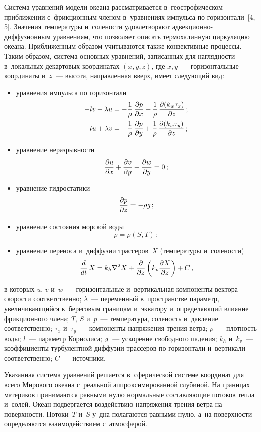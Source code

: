 \begin{multicols}{2}
  Система уравнений модели океана рассматривается в~геострофическом 
приближении с~фрикционным членом в~уравнениях импульса по 
горизон\-тали~[4, 5]. Значения температуры и~солености удовле\-творяют  
ад\-век\-ци\-он\-но-диф\-фу\-зи\-он\-ным уравнениям, что позволяет описать 
термохалинную циркуляцию океана. Приближенным образом учитываются 
также конвективные процессы. Таким образом, система основных уравнений, 
записанных для наглядности в~локальных декартовых координатах $(x, y, z)$, 
где $x, y$~--- горизонтальные координаты и~$z$~--- высота, направленная 
вверх, имеет следующий вид:
  \begin{itemize}
  \item уравнения импульса по горизонтали
  \begin{align*}
  -lv +\lambda u &=-\displaystyle\frac{\displaystyle 1\mathstrut}{\displaystyle \rho\mathstrut}\,\displaystyle\frac{\displaystyle \partial p\mathstrut}{\displaystyle \partial x\mathstrut} 
+\displaystyle\frac{\displaystyle 1\mathstrut}{\displaystyle \rho\mathstrut}\,\displaystyle\frac{\displaystyle \partial(k_w\tau_x)\mathstrut}{\displaystyle \partial z\mathstrut}\,;\\
  lu+\lambda v &= -\displaystyle\frac{\displaystyle 1\mathstrut}{\displaystyle \rho\mathstrut}\,\displaystyle\frac{\displaystyle \partial p\mathstrut}{\displaystyle \partial y\mathstrut} +\displaystyle\frac{\displaystyle 1\mathstrut}{\displaystyle \rho\mathstrut}\, 
\displaystyle\frac{\displaystyle \partial (k_w\tau_y)\mathstrut}{\displaystyle \partial z\mathstrut}\,;
  \end{align*}
  \item уравнение неразрывности
  $$
  \displaystyle\frac{\displaystyle \partial u\mathstrut}{\displaystyle \partial x\mathstrut} +\displaystyle\frac{\displaystyle \partial v\mathstrut}{\displaystyle \partial y\mathstrut} +\displaystyle\frac{\displaystyle \partial w\mathstrut}{\displaystyle \partial y\mathstrut} 
=0\,;
  $$
  \item уравнение гидростатики
  $$
  \displaystyle\frac{\displaystyle \partial p\mathstrut}{\displaystyle \partial z\mathstrut} =-\rho \mbox{\textit{g}}\,;
  $$
  \item уравнение состояния морской воды
  $$
  \rho= \rho(S,T)\,;
  $$
  \item уравнение переноса и~диффузии трассеров~$X$ (температуры 
и~солености)
  $$
  \displaystyle\frac{\displaystyle d\mathstrut}{\displaystyle dt\mathstrut}\,X= k_h\nabla^2 X+\displaystyle\frac{\displaystyle \partial\mathstrut}{\displaystyle \partial z\mathstrut}\left( k_v\displaystyle\frac{\displaystyle \partial 
X\mathstrut}{\displaystyle \partial z\mathstrut} \right) +C\,,
  $$
  \end{itemize}
в которых $u$, $v$ и~$w$~--- горизонтальные и~вертикальная компоненты вектора 
скорости соответственно; $\lambda$~--- переменный в~пространстве параметр, 
увеличивающийся к~береговым границам и~экватору и~определяющий влияние 
фрикционного члена; $T$, $S$ и~$p$~--- температура, соленость и~дав\-ле\-ние 
соответственно; $\tau_x$ и~$\tau_y$~--- компоненты напряжения трения ветра; 
$\rho$~--- плотность воды; $l$~--- параметр Кориолиса; $\mbox{\textit{g}}$~--- ускорение 
свободного падения; $k_h$ и~$k_v$~--- коэффициенты турбулентной диффузии 
трассеров по горизонтали и~вертикали соответственно; $C$~--- источники.

  Указанная система уравнений решается в~сферической системе координат 
для всего Мирового океана с~реальной аппроксимированной глубиной. На 
границах материков принимаются равными нулю нормальные составляющие 
потоков тепла и~солей. Океан подвергается воздействию напряжения трения 
ветра на поверхности. Потоки~$T$ и~$S$ у~дна полагаются равными нулю, 
а~на поверхности определяются взаимодействием с~атмосферой. 
  

\end{multicols}
